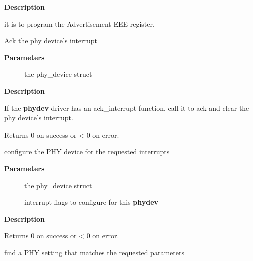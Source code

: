 \documentclass[a4paper,8pt,english]{sphinxmanual}
\begin{document}
\textbf{Description}

it is to program the Advertisement EEE register.

\begin{fulllineitems}
\label{networking/kapi:c.phy_clear_interrupt}
Ack the phy device's interrupt

\end{fulllineitems}


\textbf{Parameters}
\begin{description}
\item[{}] \leavevmode
the phy\_device struct

\end{description}

\textbf{Description}

If the \textbf{phydev} driver has an ack\_interrupt function, call it to
ack and clear the phy device's interrupt.

Returns 0 on success or \textless{} 0 on error.

\begin{fulllineitems}
\label{networking/kapi:c.phy_config_interrupt}
configure the PHY device for the requested interrupts

\end{fulllineitems}


\textbf{Parameters}
\begin{description}
\item[{}] \leavevmode
the phy\_device struct

\item[{}] \leavevmode
interrupt flags to configure for this \textbf{phydev}

\end{description}

\textbf{Description}

Returns 0 on success or \textless{} 0 on error.

\begin{fulllineitems}
\label{networking/kapi:c.phy_find_valid}
find a PHY setting that matches the requested parameters

\end{fulllineitems}
\end{document}
